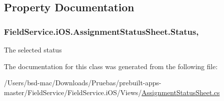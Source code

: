 \subsection{Property Documentation}
\hypertarget{class_field_service_1_1i_o_s_1_1_assignment_status_sheet_abb155f1b376ce5d6d32ac9def93e6d4b}{
\subsubsection[{Status}]{ Field\+Service.\+i\+O\+S.\+Assignment\+Status\+Sheet.\+Status\hspace{0.3cm}{\ttfamily [get]}, {\ttfamily [set]}}}\label{class_field_service_1_1i_o_s_1_1_assignment_status_sheet_abb155f1b376ce5d6d32ac9def93e6d4b}


The selected status 



The documentation for this class was generated from the following file\+:\begin{DoxyCompactItemize}
\item 
/\+Users/bsd-\/mac/\+Downloads/\+Pruebas/prebuilt-\/apps-\/master/\+Field\+Service/\+Field\+Service.\+i\+O\+S/\+Views/\hyperlink{_assignment_status_sheet_8cs}{Assignment\+Status\+Sheet.\+cs}\end{DoxyCompactItemize}
